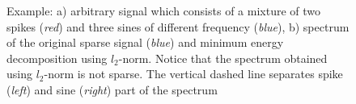 \documentclass[journal]{IEEEtran}
\begin{document}
\begin{figure}
	\centering
	
	\caption{Example: a) arbitrary signal which consists of a mixture of two spikes (\textit{red}) and three sines of different frequency (\textit{blue}), b) spectrum of the original sparse signal (\textit{blue}) and minimum energy decomposition using $l_2$-norm. Notice that the spectrum obtained using $l_2$-norm is not sparse. The vertical dashed line separates spike (\textit{left}) and sine (\textit{right}) part of the spectrum}
	
	\label{fig:example_signal_spectrum}
\end{figure}
\end{document}
